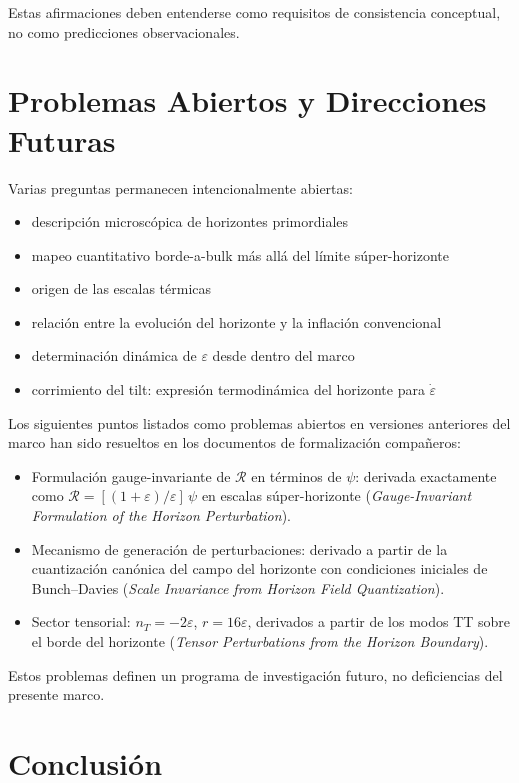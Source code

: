 \documentclass[12pt,a4paper]{article}
\begin{document}
Estas afirmaciones deben entenderse como requisitos de consistencia conceptual, no como predicciones observacionales.

\section{Problemas Abiertos y Direcciones Futuras}

Varias preguntas permanecen intencionalmente abiertas:

\begin{itemize}
  \item descripción microscópica de horizontes primordiales
  \item mapeo cuantitativo borde-a-bulk más allá del límite súper-horizonte
  \item origen de las escalas térmicas
  \item relación entre la evolución del horizonte y la inflación convencional
  \item determinación dinámica de $\varepsilon$ desde dentro del marco
  \item corrimiento del tilt: expresión termodinámica del horizonte para $\dot{\varepsilon}$
\end{itemize}

Los siguientes puntos listados como problemas abiertos en versiones anteriores del marco han sido resueltos en los documentos de formalización compañeros:

\begin{itemize}
  \item Formulación gauge-invariante de $\mathcal{R}$ en términos de $\psi$: derivada exactamente como $\mathcal{R} = [(1+\varepsilon)/\varepsilon]\,\psi$ en escalas súper-horizonte (\textit{Gauge-Invariant Formulation of the Horizon Perturbation}).
  \item Mecanismo de generación de perturbaciones: derivado a partir de la cuantización canónica del campo del horizonte con condiciones iniciales de Bunch--Davies (\textit{Scale Invariance from Horizon Field Quantization}).
  \item Sector tensorial: $n_T = -2\varepsilon$, $r = 16\varepsilon$, derivados a partir de los modos TT sobre el borde del horizonte (\textit{Tensor Perturbations from the Horizon Boundary}).
\end{itemize}

Estos problemas definen un programa de investigación futuro, no deficiencias del presente marco.

\section{Conclusión}
\end{document}

